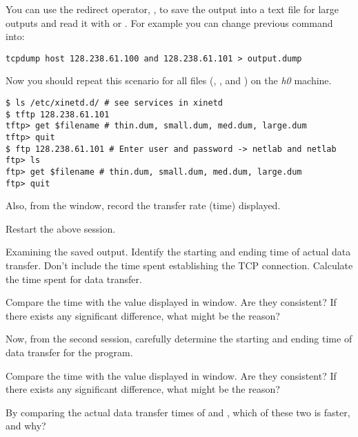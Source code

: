 \documentclass{../UTNetLab}
\begin{document}
You can use the redirect operator, \lstbash{>}, to save the  output into a text file for large  outputs and read it with  or .
For example you can change previous command into:
\begin{lstlisting}[emph={h0,h1,netlab,output,dump},morekeywords={[3]host,and}]
tcpdump host 128.238.61.100 and 128.238.61.101 > output.dump
    \end{lstlisting}

Now you should repeat this scenario for all files (, ,  and ) on the \textit{h0} machine.
\begin{lstlisting}[emph={h1,netlab},morekeywords={[2]get,quit}]
$ ls /etc/xinetd.d/ # see services in xinetd
$ tftp 128.238.61.101
tftp> get $filename # thin.dum, small.dum, med.dum, large.dum
tftp> quit
$ ftp 128.238.61.101 # Enter user and password -> netlab and netlab
ftp> ls
ftp> get $filename # thin.dum, small.dum, med.dum, large.dum
ftp> quit
    \end{lstlisting}

Also, from the  window, record the transfer rate (time) displayed.

Restart the above  session.

\begin{report}
    \item Examining the saved  output.
    Identify the starting and ending time of actual data transfer.
    Don’t include the time spent establishing the TCP connection.
    Calculate the time spent for data transfer.

    \item Compare the time with the value displayed in  window.
    Are they consistent?
    If there exists any significant difference, what might be the reason?

    \item Now, from the second session, carefully determine the starting and ending time of data transfer for the  program.

    \item Compare the time with the value displayed in  window.
    Are they consistent?
    If there exists any significant difference, what might be the reason?

    \item By comparing the actual data transfer times of  and , which of these two is faster, and why?
\end{report}
\end{document}
